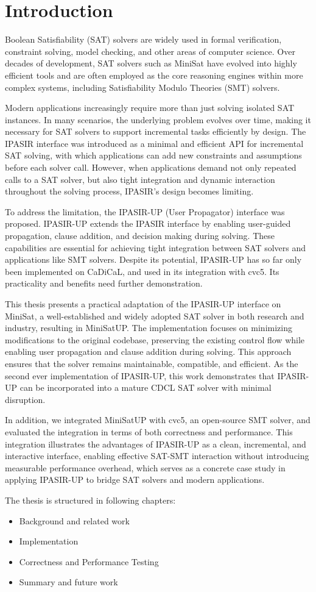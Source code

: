 \chapter{Introduction}

Boolean Satisfiability (SAT) solvers are widely used in formal verification, constraint solving, model checking, and other areas of computer science. Over decades of development, SAT solvers such as MiniSat have evolved into highly efficient tools and are often employed as the core reasoning engines within more complex systems, including Satisfiability Modulo Theories (SMT) solvers.

Modern applications increasingly require more than just solving isolated SAT instances. In many scenarios, the underlying problem evolves over time, making it necessary for SAT solvers to support incremental tasks efficiently by design. The IPASIR interface was introduced as a minimal and efficient API for incremental SAT solving, with which applications can add new constraints and assumptions before each solver call. However, when applications demand not only repeated calls to a SAT solver, but also tight integration and dynamic interaction throughout the solving process, IPASIR's design becomes limiting.

To address the limitation, the IPASIR-UP (User Propagator) interface was proposed. IPASIR-UP extends the IPASIR interface by enabling user-guided propagation, clause addition, and decision making during solving. These capabilities are essential for achieving tight integration between SAT solvers and applications like SMT solvers. Despite its potential, IPASIR-UP has so far only been implemented on CaDiCaL, and used in its integration with cvc5. Its practicality and benefits need further demonstration.

This thesis presents a practical adaptation of the IPASIR-UP interface on MiniSat, a well-established and widely adopted SAT solver in both research and industry, resulting in MiniSatUP. The implementation focuses on minimizing modifications to the original codebase, preserving the existing control flow while enabling user propagation and clause addition during solving. This approach ensures that the solver remains maintainable, compatible, and efficient. As the second ever implementation of IPASIR-UP, this work demonstrates that IPASIR-UP can be incorporated into a mature CDCL SAT solver with minimal disruption.

In addition, we integrated MiniSatUP with cvc5, an open-source SMT solver, and evaluated the integration in terms of both correctness and performance. This integration illustrates the advantages of IPASIR-UP as a clean, incremental, and interactive interface, enabling effective SAT-SMT interaction without introducing measurable performance overhead, which serves as a concrete case study in applying IPASIR-UP to bridge SAT solvers and modern applications.

The thesis is structured in following chapters:

\begin{itemize}
  \item Background and related work
  \item Implementation
  \item Correctness and Performance Testing
  \item Summary and future work
\end{itemize}
